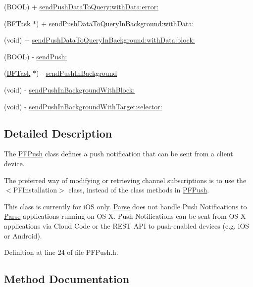 \begin{DoxyCompactItemize}
\item 
(B\+O\+O\+L) + \hyperlink{interface_p_f_push_a565a7dfcabeac3d46ba2fa0de91f6412}{send\+Push\+Data\+To\+Query\+:with\+Data\+:error\+:}
\item 
(\hyperlink{interface_b_f_task}{B\+F\+Task} $\ast$) + \hyperlink{interface_p_f_push_a2f2745a7e9c49fd3eb6890bc4dba6ce9}{send\+Push\+Data\+To\+Query\+In\+Background\+:with\+Data\+:}
\item 
(void) + \hyperlink{interface_p_f_push_ae0fbe5b29d3f5a4af509623acd2a67a7}{send\+Push\+Data\+To\+Query\+In\+Background\+:with\+Data\+:block\+:}
\item 
(B\+O\+O\+L) -\/ \hyperlink{interface_p_f_push_a4b90df571e65bca79059b6bd573459bc}{send\+Push\+:}
\item 
(\hyperlink{interface_b_f_task}{B\+F\+Task} $\ast$) -\/ \hyperlink{interface_p_f_push_af8f50e2738cbc4743fa93440f8b91545}{send\+Push\+In\+Background}
\item 
(void) -\/ \hyperlink{interface_p_f_push_adc8ff70ef7f5b03dad376029e3a23f16}{send\+Push\+In\+Background\+With\+Block\+:}
\item 
(void) -\/ \hyperlink{interface_p_f_push_ad8f340b9ffeb49f16c38be200d13a18b}{send\+Push\+In\+Background\+With\+Target\+:selector\+:}
\end{DoxyCompactItemize}


\subsection{Detailed Description}
The {\ttfamily \hyperlink{interface_p_f_push}{P\+F\+Push}} class defines a push notification that can be sent from a client device.

The preferred way of modifying or retrieving channel subscriptions is to use the $<$\+P\+F\+Installation$>$ class, instead of the class methods in {\ttfamily \hyperlink{interface_p_f_push}{P\+F\+Push}}.

This class is currently for i\+O\+S only. \hyperlink{interface_parse}{Parse} does not handle Push Notifications to \hyperlink{interface_parse}{Parse} applications running on O\+S X. Push Notifications can be sent from O\+S X applications via Cloud Code or the R\+E\+S\+T A\+P\+I to push-\/enabled devices (e.\+g. i\+O\+S or Android). 

Definition at line 24 of file P\+F\+Push.\+h.



\subsection{Method Documentation}
\hypertarget{interface_p_f_push_a349b1b43b499be265940ff64252d10fa}{}
